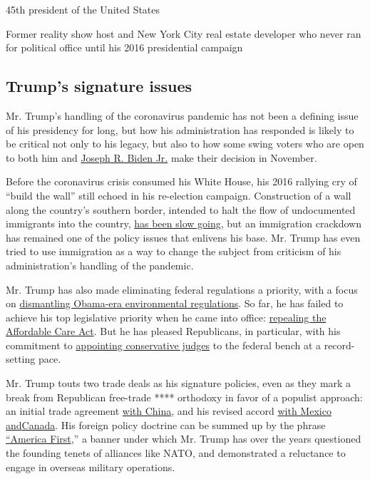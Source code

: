 45th president of the United States

Former reality show host and New York City real estate developer who
never ran for political office until his 2016 presidential campaign

\hypertarget{trumps-signature-issues}{%
\subsection{Trump's signature issues}\label{trumps-signature-issues}}

Mr. Trump's handling of the coronavirus pandemic has not been a defining
issue of his presidency for long, but how his administration has
responded is likely to be critical not only to his legacy, but also to
how some swing voters who are open to both him and
\href{https://www.nytimes3xbfgragh.onion/interactive/2020/us/elections/joe-biden.html}{Joseph
R. Biden Jr.} make their decision in November.

Before the coronavirus crisis consumed his White House, his 2016
rallying cry of ``build the wall'' still echoed in his re-election
campaign. Construction of a wall along the country's southern border,
intended to halt the flow of undocumented immigrants into the country,
\href{https://www.nytimes3xbfgragh.onion/2019/11/08/us/border-wall-texas.html}{has
been slow going}, but an immigration crackdown has remained one of the
policy issues that enlivens his base. Mr. Trump has even tried to use
immigration as a way to change the subject from criticism of his
administration's handling of the pandemic.

Mr. Trump has also made eliminating federal regulations a priority, with
a focus on
\href{https://www.nytimes3xbfgragh.onion/interactive/2019/climate/trump-environment-rollbacks.html}{dismantling
Obama-era environmental regulations}. So far, he has failed to achieve
his top legislative priority when he came into office:
\href{https://www.nytimes3xbfgragh.onion/2019/05/01/health/unconstitutional-trump-aca.html}{repealing
the Affordable Care Act}. But he has pleased Republicans, in particular,
with his commitment to
\href{https://www.nytimes3xbfgragh.onion/2020/03/14/us/trump-appeals-court-judges.html}{appointing
conservative judges} to the federal bench at a record-setting pace.

Mr. Trump touts two trade deals as his signature policies, even as they
mark a break from Republican free-trade **** orthodoxy in favor of a
populist approach: an initial trade agreement
\href{https://www.nytimes3xbfgragh.onion/2020/01/15/business/economy/china-trade-deal.html}{with
China}, and his revised accord
\href{https://www.nytimes3xbfgragh.onion/2019/12/01/us/politics/trump-trade-deal-usmca.html}{with
Mexico
and}\href{https://www.nytimes3xbfgragh.onion/2019/12/01/us/politics/trump-trade-deal-usmca.html}{Canada}.
His foreign policy doctrine can be summed up by the phrase
\href{https://www.nytimes3xbfgragh.onion/2018/12/21/us/politics/trump-mattis-american-first-foreign-policy.html}{``America
First},'' a banner under which Mr. Trump has over the years questioned
the founding tenets of alliances like NATO, and demonstrated a
reluctance to engage in overseas military operations.

